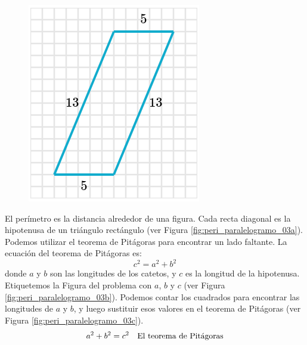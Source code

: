 \begin{solutionbox}{16cm}
\begin{minipage}{0.4\textwidth}
\begin{multicols}{2}
\begin{figure}[H]
                \includegraphics[width=0.9\linewidth]{../images/peri_paralelogramo_03d.png}
                \caption{}
                \label{fig:peri_paralelogramo_03d}
            \end{figure}
        \end{multicols}
    \end{minipage}\hfill
    \begin{minipage}{0.55\textwidth}
        El perímetro es la distancia alrededor de una figura.
        Cada recta diagonal es la hipotenusa de un triángulo rectángulo (ver Figura \ref{fig:peri_paralelogramo_03a}).
        Podemos utilizar el teorema de Pitágoras para encontrar un lado faltante.
        La ecuación del teorema de Pitágoras es:
        \[c^2=a^2+b^2\]
        donde $a$ y $b$ son las longitudes de los catetos, y $c$ es la longitud de la hipotenusa.
        Etiquetemos la Figura del problema con $a$, $b$ y $c$ (ver Figura \ref{fig:peri_paralelogramo_03b}).
        Podemos contar los cuadrados para encontrar las longitudes de $a$ y $b$, y luego sustituir esos valores en el teorema de Pitágoras (ver Figura \ref{fig:peri_paralelogramo_03c}).
        \begin{align*}
            a^2+b^2  =c^2  & \text{\quad El teorema de Pitágoras}                          \\

\end{align*}
\end{minipage}
\end{solutionbox}
